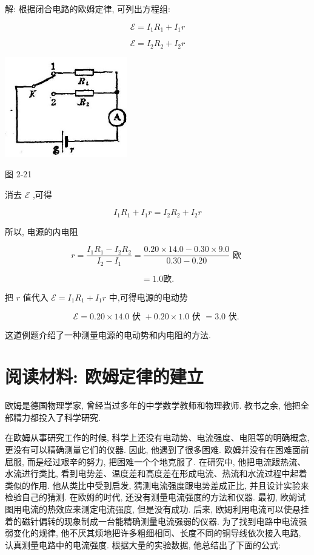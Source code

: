 \documentclass[10pt]{article}
\begin{document}
解: 根据闭合电路的欧姆定律, 可列出方程组:

\[
\mathcal{E} = {I}_{1}{R}_{1} + {I}_{1}r
\]

\[
\mathcal{E} = {I}_{2}{R}_{2} + {I}_{2}r
\]

\begin{center}
\includegraphics[max width=0.4\textwidth]{images/01913056-1f15-74d8-9184-9aab52c9d66b_89_626039.jpg}
\end{center}

图 2-21

消去 \(\mathcal{E}\) ,可得

\[
{I}_{1}{R}_{1} + {I}_{1}r = {I}_{2}{R}_{2} + {I}_{2}r
\]

所以, 电源的内电阻

\[
r = \frac{{I}_{1}{R}_{1} - {I}_{2}{R}_{2}}{{I}_{2} - {I}_{1}} = \frac{{0.20} \times {14.0} - {0.30} \times {9.0}}{{0.30} - {0.20}}\text{ 欧 }
\]

\[
= {1.0}\text{欧.}
\]

把 \(r\) 值代入 \(\mathcal{E} = {I}_{1}{R}_{1} + {I}_{1}r\) 中,可得电源的电动势

\[
\mathcal{E} = {0.20} \times {14.0}\text{ 伏 } + {0.20} \times {1.0}\text{ 伏 } = {3.0}\text{ 伏. }
\]

这道例题介绍了一种测量电源的电动势和内电阻的方法.

\section*{阅读材料: 欧姆定律的建立}

欧姆是德国物理学家, 曾经当过多年的中学数学教师和物理教师. 教书之余, 他把全部精力都投入了科学研究.

在欧姆从事研究工作的时候, 科学上还没有电动势、电流强度、电阻等的明确概念, 更没有可以精确测量它们的仪器. 因此, 他遇到了很多困难. 欧姆并没有在困难面前屈服, 而是经过艰辛的努力, 把困难一个个地克服了. 在研究中, 他把电流跟热流、水流进行类比, 看到电势差、温度差和高度差在形成电流、热流和水流过程中起着类似的作用. 他从类比中受到启发, 猜测电流强度跟电势差成正比, 并且设计实验来检验自己的猜测. 在欧姆的时代, 还没有测量电流强度的方法和仪器. 最初, 欧姆试图用电流的热效应来测定电流强度, 但是没有成功. 后来, 欧姆利用电流可以使悬挂着的磁针偏转的现象制成一台能精确测量电流强弱的仪器. 为了找到电路中电流强弱变化的规律, 他不厌其烦地把许多粗细相同、长度不同的铜导线依次接入电路, 认真测量电路中的电流强度. 根据大量的实验数据, 他总结出了下面的公式:
\end{document}
